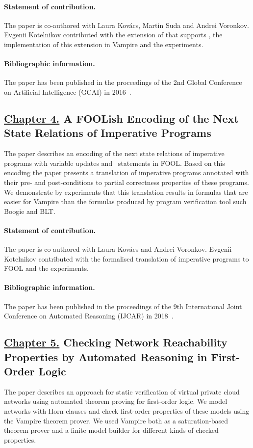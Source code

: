 \paragraph{Statement of contribution.} The paper is co-authored with Laura Kov\'{a}cs, Martin Suda and Andrei Voronkov. Evgenii Kotelnikov contributed with the extension of \newcnf{} that supports \folb{}, the implementation of this extension in Vampire and the experiments.

\paragraph{Bibliographic information.} The paper has been published in the proceedings of the 2nd Global Conference on Artificial Intelligence (GCAI) in 2016~\cite{FOOLCNF}.

\subsection*{\hyperref[chap:boogie]{Chapter 4.} A FOOLish Encoding of the Next State Relations of Imperative Programs}
The paper describes an encoding of the next state relations of imperative programs with variable updates and \ITE\ statements in FOOL. Based on this encoding the paper presents a translation of imperative programs annotated with their pre- and post-conditions to partial correctness properties of these programs. We demonstrate by experiments that this translation results in formulas that are easier for Vampire than the formulas produced by program verification tool such Boogie and BLT.

\paragraph{Statement of contribution.} The paper is co-authored with Laura Kov\'{a}cs and Andrei Voronkov. Evgenii Kotelnikov contributed with the formalised translation of imperative programs to FOOL and the experiments.

\paragraph{Bibliographic information.} The paper has been published in the proceedings of the 9th International Joint Conference on Automated Reasoning (IJCAR) in 2018~\cite{KKV18}.

\subsection*{\hyperref[chap:aws]{Chapter 5.} Checking Network Reachability Properties by Automated Reasoning in First-Order Logic}
The paper describes an approach for static verification of virtual private cloud networks using automated theorem proving for first-order logic. We model networks with Horn clauses and check first-order properties of these models using the Vampire theorem prover. We used Vampire both as a saturation-based theorem prover and a finite model builder for different kinds of checked properties.

